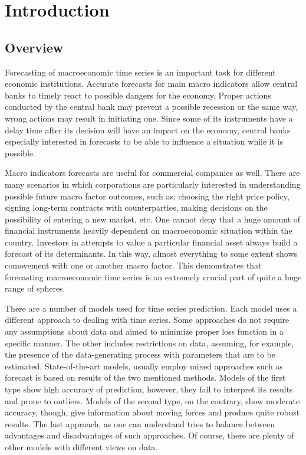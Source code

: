 \documentclass[a4paper, 14pt]{article}
\begin{document}
\section{Introduction}
\subsection{Overview}
Forecasting of macroeconomic time series is an important task for different economic institutions. Accurate forecasts for main macro indicators allow central banks to timely react to possible dangers for the economy. Proper actions conducted by the central bank may prevent a possible recession or the same way, wrong actions may result in initiating one.  Since some of its instruments have a delay time after its decision will have an impact on the economy, central banks especially interested in forecasts to be able to influence a situation while it is possible.

Macro indicators forecasts are useful for commercial companies as well. There are many scenarios in which corporations are particularly interested in understanding possible future macro factor outcomes, such as: choosing the right price policy, signing long-term contracts with counterparties, making decisions on the possibility of entering a new market, etc. One cannot deny that a huge amount of financial instruments heavily dependent on macroeconomic situation within the country. Investors in attempts to value a particular financial asset always build a forecast of its determinants. In this way, almost everything to some extent shows comovement with one or another macro factor. This demonstrates that forecasting macroeconomic time series is an extremely crucial part of quite a huge range of spheres.  

There are a number of models used for time series prediction. Each model uses a different approach to dealing with time series. Some approaches do not require any assumptions about data and aimed to minimize proper loss function in a specific manner. The other includes restrictions on data, assuming, for example, the presence of the data-generating process with parameters that are to be estimated. State-of-the-art models, usually employ mixed approaches such as forecast is based on results of the two mentioned methods. Models of the first type show high accuracy of prediction, however, they fail to interpret its results and prone to outliers. Models of the second type, on the contrary, show moderate accuracy, though, give information about moving forces and produce quite robust results. The last approach, as one can understand tries to balance between advantages and disadvantages of such approaches. Of course, there are plenty of other models with different views on data. 
\end{document}
